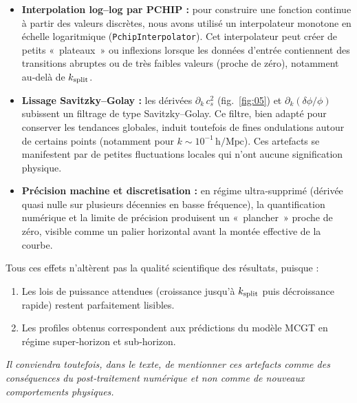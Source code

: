 \begin{itemize}
  \item \textbf{Interpolation log–log par PCHIP :} pour construire une fonction continue à partir des valeurs discrètes, nous avons utilisé un interpolateur monotone en échelle logaritmique (\texttt{PchipInterpolator}). Cet interpolateur peut créer de petits « plateaux » ou inflexions lorsque les données d’entrée contiennent des transitions abruptes ou de très faibles valeurs (proche de zéro), notamment au‑delà de $k_{\rm split}$.
  \item \textbf{Lissage Savitzky–Golay :} les dérivées $\partial_k\,c_s^2$ (fig.~\ref{fig:05}) et $\partial_k(\delta\phi/\phi)$ subissent un filtrage de type Savitzky–Golay. Ce filtre, bien adapté pour conserver les tendances globales, induit toutefois de fines ondulations autour de certains points (notamment pour $k\sim10^{-1}\,\mathrm{h/Mpc}$). Ces artefacts se manifestent par de petites fluctuations locales qui n’ont aucune signification physique.
  \item \textbf{Précision machine et discretisation :} en régime ultra‑supprimé (dérivée quasi nulle sur plusieurs décennies en basse fréquence), la quantification numérique et la limite de précision produisent un « plancher » proche de zéro, visible comme un palier horizontal avant la montée effective de la courbe.
\end{itemize}

Tous ces effets n’altèrent pas la qualité scientifique des résultats, puisque :
\begin{enumerate}
  \item Les lois de puissance attendues (croissance jusqu’à $k_{\rm split}$ puis décroissance rapide) restent parfaitement lisibles.
  \item Les profiles obtenus correspondent aux prédictions du modèle MCGT en régime super‑horizon et sub‑horizon.
\end{enumerate}

\noindent
\textit{Il conviendra toutefois, dans le texte, de mentionner ces artefacts comme des conséquences du post‑traitement numérique et non comme de nouveaux comportements physiques.}
